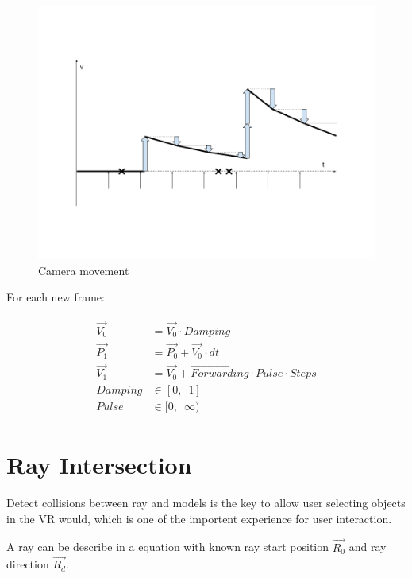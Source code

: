 \begin{figure}[H]
\caption[camera-movement]{Camera movement}
\label{fig:camera-movement}
\centering
\includegraphics[width=\linewidth]{Figures/camera-movement.png}
\decoRule
\end{figure}

For each new frame:

\[
\begin{array}{lr}
\begin{aligned}
\overrightarrow{V_0} &= \overrightarrow{V_0} \cdot Damping \\
\overrightarrow{P_1} &= \overrightarrow{P_0} + \overrightarrow{V_0} \cdot dt \\
\overrightarrow{V_1} &= \overrightarrow{V_0} + \overrightarrow{Forwarding} \cdot Pulse \cdot Steps \\
Damping &\in [0,\enspace1] \\
Pulse &\in [0,\enspace \infty)
\end{aligned}
\end{array}
\]

\section{Ray Intersection}

Detect collisions between ray and models is the key to allow user selecting objects in the VR would, which is one of the importent experience for user interaction.

A ray can be describe in a equation with known ray start position \emph{$\overrightarrow{R_0}$} and ray direction \emph{$\overrightarrow{R_d}$}.

